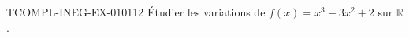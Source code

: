 \begin{exercice}{TCOMPL-INEG-EX-010}{1}{12}
Étudier les variations de $f(x) = x^3 - 3x^2 + 2$ sur $\mathbb{R}$.

\end{exercice}
